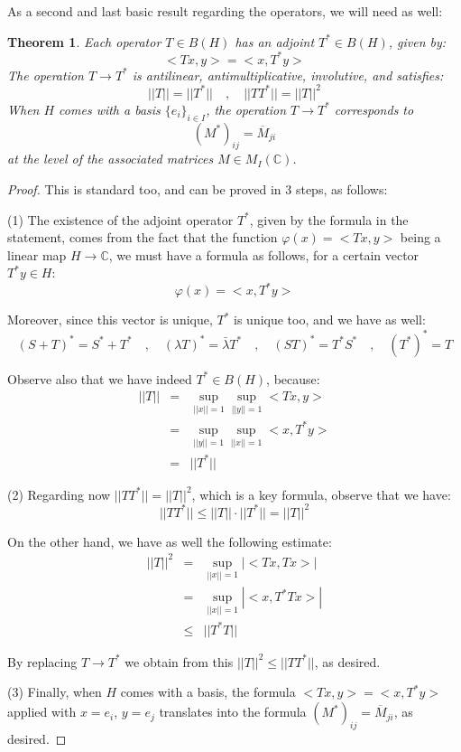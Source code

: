 \documentclass[12pt]{amsbook}
\newtheorem{theorem}{Theorem}[chapter]
\begin{document}
As a second and last basic result regarding the operators, we will need as well:


\begin{theorem}
Each operator $T\in B(H)$ has an adjoint $T^*\in B(H)$, given by: 
$$<Tx,y>=<x,T^*y>$$
The operation $T\to T^*$ is antilinear, antimultiplicative, involutive, and satisfies:
$$||T||=||T^*||\quad,\quad ||TT^*||=||T||^2$$
When $H$ comes with a basis $\{e_i\}_{i\in I}$, the operation $T\to T^*$ corresponds to
$$(M^*)_{ij}=\overline{M}_{ji}$$ 
at the level of the associated matrices $M\in M_I(\mathbb C)$.
\end{theorem}

\begin{proof}
This is standard too, and can be proved in 3 steps, as follows:

\medskip

(1) The existence of the adjoint operator $T^*$, given by the formula in the statement, comes from the fact that the function $\varphi(x)=<Tx,y>$ being a linear map $H\to\mathbb C$, we must have a formula as follows, for a certain vector $T^*y\in H$:
$$\varphi(x)=<x,T^*y>$$

Moreover, since this vector is unique, $T^*$ is unique too, and we have as well:
$$(S+T)^*=S^*+T^*\quad,\quad
(\lambda T)^*=\bar{\lambda}T^*\quad,\quad 
(ST)^*=T^*S^*\quad,\quad 
(T^*)^*=T$$

Observe also that we have indeed $T^*\in B(H)$, because:
\begin{eqnarray*}
||T||
&=&\sup_{||x||=1}\sup_{||y||=1}<Tx,y>\\
&=&\sup_{||y||=1}\sup_{||x||=1}<x,T^*y>\\
&=&||T^*||
\end{eqnarray*}

(2) Regarding now $||TT^*||=||T||^2$, which is a key formula, observe that we have:
$$||TT^*||
\leq||T||\cdot||T^*||
=||T||^2$$

On the other hand, we have as well the following estimate:
\begin{eqnarray*}
||T||^2
&=&\sup_{||x||=1}|<Tx,Tx>|\\
&=&\sup_{||x||=1}|<x,T^*Tx>|\\
&\leq&||T^*T||
\end{eqnarray*}

By replacing $T\to T^*$ we obtain from this $||T||^2\leq||TT^*||$, as desired.

\medskip

(3) Finally, when $H$ comes with a basis, the formula $<Tx,y>=<x,T^*y>$ applied with $x=e_i$, $y=e_j$ translates into the formula $(M^*)_{ij}=\overline{M}_{ji}$, as desired.
\end{proof}
\end{document}
